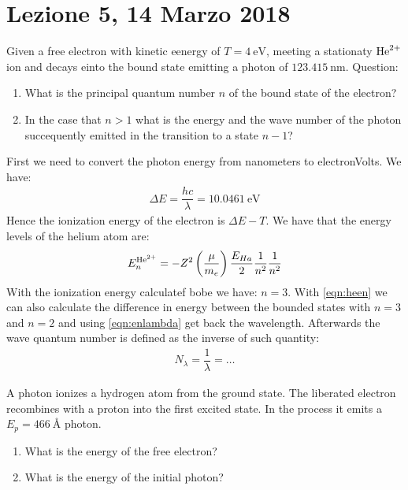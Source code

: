 \documentclass[../AppuntiStruttura.tex]{subfiles}
\begin{document}
\section*{Lezione 5, 14 Marzo 2018}

	\begin{exe}
		Given a free electron with kinetic eenergy of $ T=\SI{4}{\electronvolt} $, meeting a stationaty $ \mathrm{He}^{2+} $ ion and decays einto the bound state emitting a photon of $ \SI{123.415}{\nano\meter} $. 
		Question:
		\begin{enumerate}
			\item What is the principal quantum number $ n $ of the bound state of the electron? 
			\item In the case that $ n>1 $ what is the energy and the wave number of the photon succequently emitted in the transition to a state $ n-1 $?
		\end{enumerate}
	\end{exe}
	\begin{sol}
		First we need to convert the photon energy from nanometers to electronVolts. We have:
		\begin{gather}
			\label{eqn:enlambda}
			\Delta E = \dfrac{hc}{\lambda}=\SI{10.0461}{\electronvolt}
		\end{gather}
		Hence the ionization energy of the electron is $ \Delta E - T $. We have that the energy levels of the helium atom are:
		\begin{gather}
		\label{eqn:heen}
		E_{n}^{\mathrm{He}^{2+}}=-Z^{2}\left(\dfrac{\mu}{m_{e}}\right)\dfrac{E_{Ha}}{2}\dfrac{1}{n^{2}}\dfrac{1}{n^{2}}
		\end{gather}
		With the ionization energy calculatef bobe we have: $ n=3 $. With \ref{eqn:heen} we can also calculate the difference in energy between the bounded states with $ n=3 $ and $ n=2 $ and using \ref{eqn:enlambda} get back the wavelength. Afterwards the wave quantum number is defined as the inverse of such quantity:
		\begin{gather*}
		N_\lambda=\dfrac{1}{\lambda}=\dots
		\end{gather*}
	\end{sol}
	\begin{exe}
		A photon ionizes a hydrogen atom from the ground state. The liberated electron recombines with a proton into the first excited state. In the process it emits a $ E_{p}=\SI{466}{\angstrom} $ photon.
		\begin{enumerate}
			\item What is the energy of the free electron?
			\item What is the energy of the initial photon?
		\end{enumerate}
	\end{exe}
\end{document}
